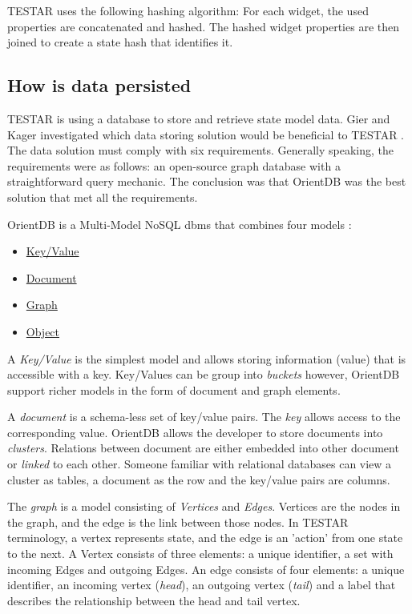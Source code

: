 TESTAR uses the following hashing algorithm: For each widget, the used properties are concatenated and hashed. The hashed widget properties are then joined to create a state hash that identifies it. 

\subsection{How is data persisted}

TESTAR is using a database to store and retrieve state model data. Gier and Kager investigated which data storing solution would be beneficial to TESTAR \cite{GierKager}. The data solution must comply with six requirements. Generally speaking, the requirements were as follows: an open-source graph database with a straightforward query mechanic. The conclusion was that OrientDB was the best solution that met all the requirements.

OrientDB is a Multi-Model NoSQL \acrfull{dbms} that combines four models \cite{orientDbModeling}:

\begin{itemize}
    \item \hyperlink{db:key-value}{Key/Value}
    \item \hyperlink{db:document}{Document}
    \item \hyperlink{db:graph}{Graph}
    \item \hyperlink{db:object}{Object}
\end{itemize}

A \hypertarget{db:key-value}{\emph{Key/Value}} is the simplest model and allows storing information (value) that is accessible with a key. Key/Values can be group into \textit{buckets} however, OrientDB support richer models in the form of document and graph elements.

A \hypertarget{db:document}{\emph{document}} is a schema-less set of key/value pairs. The \emph{key} allows access to the corresponding value. OrientDB allows the developer to store documents into \emph{clusters}. Relations between document are either embedded into other document or \emph{linked} to each other. Someone familiar with relational databases can view a cluster as tables, a document as the row and the key/value pairs are columns.

The \hypertarget{db:graph}{\emph{graph}} is a model consisting of \emph{Vertices} and \emph{Edges}. Vertices are the nodes in the graph, and the edge is the link between those nodes. In TESTAR terminology, a vertex represents state, and the edge is an 'action' from one state to the next. A Vertex consists of three elements: a unique identifier, a set with incoming Edges and outgoing Edges. An edge consists of four elements: a unique identifier, an incoming vertex (\emph{head}), an outgoing vertex (\emph{tail}) and a label that describes the relationship between the head and tail vertex.\par

